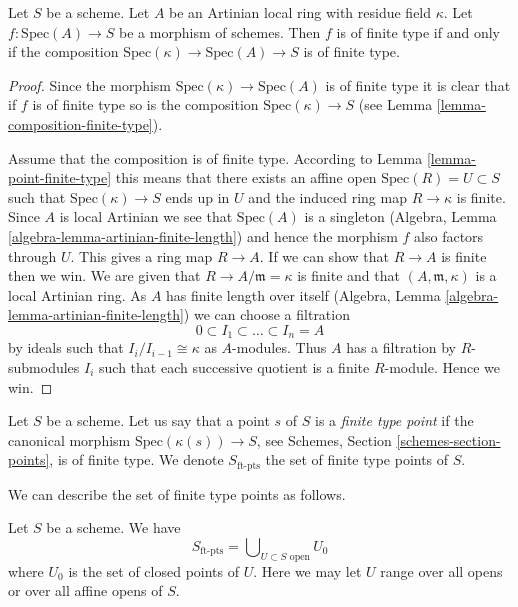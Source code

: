 \begin{lemma}
\label{lemma-artinian-finite-type}
Let $S$ be a scheme.
Let $A$ be an Artinian local ring with residue field $\kappa$.
Let $f : \text{Spec}(A) \to S$ be a morphism of schemes.
Then $f$ is of finite type if and only if the composition
$\text{Spec}(\kappa) \to \text{Spec}(A) \to S$ is of finite type.
\end{lemma}

\begin{proof}
Since the morphism $\text{Spec}(\kappa) \to \text{Spec}(A)$ is of finite
type it is clear that if $f$ is of finite type so is the composition
$\text{Spec}(\kappa) \to S$ (see Lemma \ref{lemma-composition-finite-type}).

\medskip\noindent
Assume that the composition is of finite type. According to
Lemma \ref{lemma-point-finite-type} this means that there exists
an affine open $\text{Spec}(R) = U \subset S$ such that
$\text{Spec}(\kappa) \to S$ ends up in $U$ and the induced ring map
$R \to \kappa$ is finite. Since $A$ is local Artinian we see that
$\text{Spec}(A)$ is a singleton
(Algebra, Lemma \ref{algebra-lemma-artinian-finite-length})
and hence the morphism $f$ also factors
through $U$. This gives a ring map $R \to A$. If we can show that $R \to A$
is finite then we win. We are given that $R \to A/\mathfrak m = \kappa$
is finite and that $(A, \mathfrak m, \kappa)$ is a local Artinian
ring. As $A$ has finite length over itself
(Algebra, Lemma \ref{algebra-lemma-artinian-finite-length})
we can choose a filtration
$$
0 \subset I_1 \subset \ldots \subset I_n = A
$$
by ideals such that $I_i/I_{i - 1} \cong \kappa$ as $A$-modules.
Thus $A$ has a filtration by $R$-submodules $I_i$ such that each
successive quotient is a finite $R$-module. Hence we win.
\end{proof}

\begin{definition}
\label{definition-finite-type-point}
Let $S$ be a scheme.
Let us say that a point $s$ of $S$ is a {\it finite type point}
if the canonical morphism $\text{Spec}(\kappa(s)) \to S$, see
Schemes, Section \ref{schemes-section-points}, is of finite type.
We denote $S_{\text{ft-pts}}$
the set of finite type points of $S$.
\end{definition}

\noindent
We can describe the set of finite type points as follows.

\begin{lemma}
\label{lemma-identify-finite-type-points}
Let $S$ be a scheme. We have
$$
S_{\text{ft-pts}} = \bigcup\nolimits_{U \subset S\text{ open}} U_0
$$
where $U_0$ is the set of closed points of $U$.
Here we may let $U$ range over all opens or over all affine opens of $S$.
\end{lemma}

